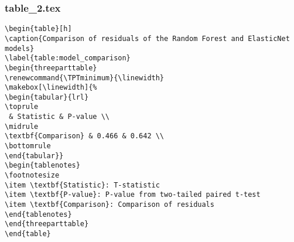\documentclass[11pt]{article}
\begin{document}
\subsubsection*{table\_2.tex}

\begin{Verbatim}[tabsize=4]
\begin{table}[h]
\caption{Comparison of residuals of the Random Forest and ElasticNet models}
\label{table:model_comparison}
\begin{threeparttable}
\renewcommand{\TPTminimum}{\linewidth}
\makebox[\linewidth]{%
\begin{tabular}{lrl}
\toprule
 & Statistic & P-value \\
\midrule
\textbf{Comparison} & 0.466 & 0.642 \\
\bottomrule
\end{tabular}}
\begin{tablenotes}
\footnotesize
\item \textbf{Statistic}: T-statistic
\item \textbf{P-value}: P-value from two-tailed paired t-test
\item \textbf{Comparison}: Comparison of residuals
\end{tablenotes}
\end{threeparttable}
\end{table}

\end{Verbatim}
\end{document}
